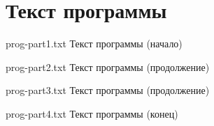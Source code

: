 \chapter{Текст программы}

{prog-part1.txt} %
{Текст программы (начало)} %

\clearpage

{prog-part2.txt} %
{Текст программы (продолжение)} %

{prog-part3.txt} %
{Текст программы (продолжение)} %

\clearpage

{prog-part4.txt} %
{Текст программы (конец)} %